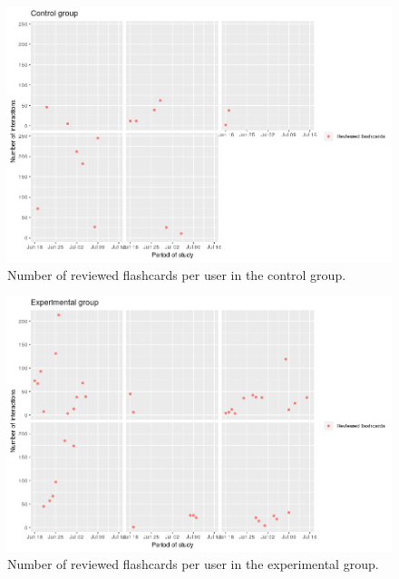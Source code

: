 \begin{figure}[htb]
    \vskip 5mm
        \begin{center}
            \includegraphics[scale=0.45]{./Figures/con_n_flashcards.png}
            \caption{Number of reviewed flashcards per user in the control group.}
            \label{fig:cards-control}
        \end{center}
    \vskip -5mm
\end{figure}

\begin{figure}[htb]
    \vskip 5mm
        \begin{center}
            \includegraphics[scale=0.45]{./Figures/exp_n_flashcards.png}
            \caption{Number of reviewed flashcards per user in the experimental group.}
            \label{fig:cards-experimental}
        \end{center}
    \vskip -5mm
\end{figure}

